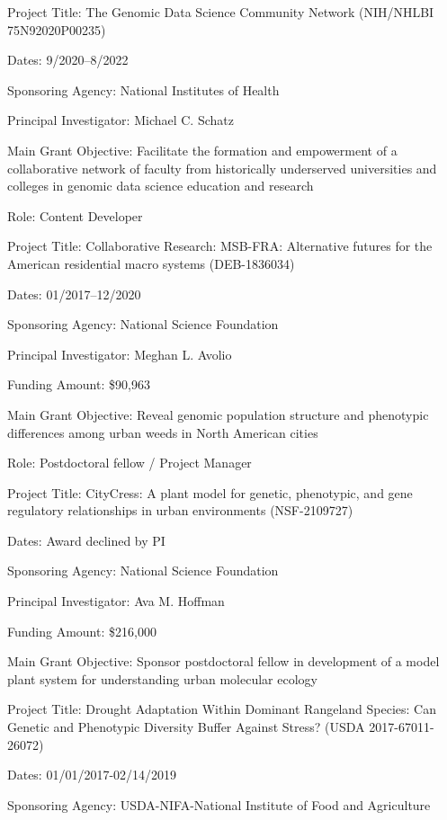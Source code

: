 \documentclass{cv}
\begin{document}
Project Title: The Genomic Data Science Community Network (NIH/NHLBI 75N92020P00235)

Dates: 9/2020--8/2022

Sponsoring Agency: National Institutes of Health

Principal Investigator: Michael C. Schatz

Main Grant Objective: Facilitate the formation and empowerment of a collaborative network of faculty from historically underserved universities and colleges in genomic data science education and research

Role: Content Developer

\vspace{5mm}

Project Title: Collaborative Research: MSB-FRA: Alternative futures for the American residential macro systems (DEB-1836034)

Dates: 01/2017--12/2020

Sponsoring Agency: National Science Foundation

Principal Investigator: Meghan L. Avolio

Funding Amount: \$90,963

Main Grant Objective: Reveal genomic population structure and phenotypic differences among urban weeds in North American cities

Role: Postdoctoral fellow / Project Manager

\vspace{5mm}

Project Title: CityCress: A plant model for genetic, phenotypic, and gene regulatory relationships in urban environments (NSF-2109727)

Dates: Award declined by PI

Sponsoring Agency: National Science Foundation

Principal Investigator: Ava M. Hoffman

Funding Amount: \$216,000

Main Grant Objective: Sponsor postdoctoral fellow in development of a model plant system for understanding urban molecular ecology

\vspace{5mm}

Project Title: Drought Adaptation Within Dominant Rangeland Species: Can Genetic and Phenotypic Diversity Buffer Against Stress? (USDA 2017-67011-26072)

Dates: 01/01/2017-02/14/2019

Sponsoring Agency: USDA-NIFA-National Institute of Food and Agriculture
\end{document}
